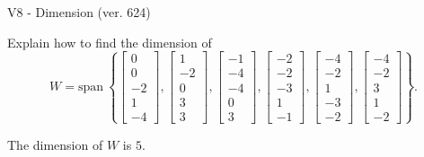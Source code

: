 \begin{exercise}
  \begin{exerciseTitle}V8 - Dimension (ver. 624)\end{exerciseTitle}
  \begin{exerciseStatement}
    Explain how to find the dimension of 
\[W=\mathrm{span}\ \left\{\left[\begin{array}{r}
0 \\
0 \\
-2 \\
1 \\
-4
\end{array}\right] , \left[\begin{array}{r}
1 \\
-2 \\
0 \\
3 \\
3
\end{array}\right] , \left[\begin{array}{r}
-1 \\
-4 \\
-4 \\
0 \\
3
\end{array}\right] , \left[\begin{array}{r}
-2 \\
-2 \\
-3 \\
1 \\
-1
\end{array}\right] , \left[\begin{array}{r}
-4 \\
-2 \\
1 \\
-3 \\
-2
\end{array}\right] , \left[\begin{array}{r}
-4 \\
-2 \\
3 \\
1 \\
-2
\end{array}\right]\right\}.\]



  \end{exerciseStatement}
  \begin{exerciseAnswer}
   The dimension of \(W\) is  \(5\).
  


  \end{exerciseAnswer}
\end{exercise}